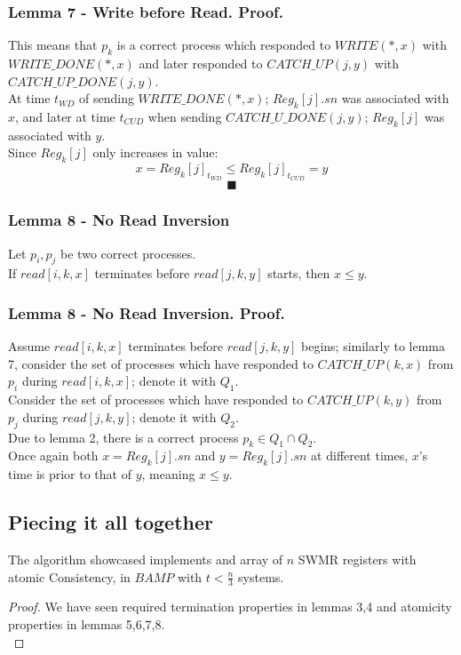 \begin{frame}
    \frametitle{Lemma 7 - Write before Read. Proof.}
    This means that $p_k$ is a \alert{correct process} which responded to
    $WRITE(*,x)$ with $WRITE\_DONE(*,x)$ and \alert{later} responded to $CATCH\_UP(j,y)$ with
    $CATCH\_UP\_DONE(j,y)$.\\
    At time $t_{WD}$ of sending $WRITE\_DONE(*,x)$; $Reg_k[j].sn$ was associated
    with $x$, and later at time $t_{CUD}$ when sending $CATCH\_U\_DONE(j,y)$; $Reg_k[j]$ was associated
    with $y$.\\
    Since $Reg_k[j]$ only increases in value:
    \[
        x=Reg_k[j]_{t_{WD}}\leq Reg_k[j]_{t_{CUD}}=y    
    \]
    \[\blacksquare \]
\end{frame}

\begin{frame}
    \frametitle{Lemma 8 - No Read Inversion}
    \begin{lemma}
        Let $p_i, p_j$ be two correct processes.\\
        If $read[i,k,x]$ terminates before $read[j,k,y]$ starts, then $x\leq y$.
    \end{lemma}
\end{frame}
\begin{frame}
    \frametitle{Lemma 8 - No Read Inversion. Proof.}
    Assume $read[i,k,x]$ terminates before $read[j,k,y]$
    begins; similarly to lemma 7,
    consider the set of processes which have responded to
    $CATCH\_UP(k, x)$ from $p_i$ during $read[i,k,x]$; denote it with $Q_1$.\\
    Consider the set of processes which have responded to
    $CATCH\_UP(k,y)$ from $p_j$ during $read[j,k,y]$; denote it with $Q_2$.\\
    Due to lemma 2, there is a correct process $p_k\in Q_1\cap Q_2$.\\
    Once again both $x=Reg_k[j].sn$ and $y=Reg_k[j].sn$ at different times,
    $x$'s time is prior to that of $y$,
    meaning $x\leq y$.
\end{frame}

\subsection{Piecing it all together}
\begin{frame}
    \begin{theorem}
        The algorithm showcased implements and array of $n$ SWMR
        registers with atomic Consistency, in $BAMP$ with $t<\frac{n}{3}$ systems.
    \end{theorem}
    \begin{proof}
        We have seen required termination properties in lemmas 3,4 and atomicity
        properties in lemmas 5,6,7,8.\\
    \end{proof}
\end{frame}


